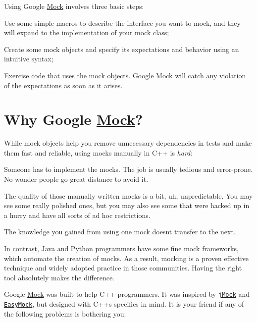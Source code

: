 Using Google \hyperlink{classMock}{Mock} involves three basic steps\+:


\begin{DoxyEnumerate}
\item Use some simple macros to describe the interface you want to mock, and they will expand to the implementation of your mock class;
\end{DoxyEnumerate}
\begin{DoxyEnumerate}
\item Create some mock objects and specify its expectations and behavior using an intuitive syntax;
\end{DoxyEnumerate}
\begin{DoxyEnumerate}
\item Exercise code that uses the mock objects. Google \hyperlink{classMock}{Mock} will catch any violation of the expectations as soon as it arises.
\end{DoxyEnumerate}

\section*{Why Google \hyperlink{classMock}{Mock}?}

While mock objects help you remove unnecessary dependencies in tests and make them fast and reliable, using mocks manually in C++ is {\itshape hard}\+:


\begin{DoxyItemize}
\item Someone has to implement the mocks. The job is usually tedious and error-\/prone. No wonder people go great distance to avoid it.
\item The quality of those manually written mocks is a bit, uh, unpredictable. You may see some really polished ones, but you may also see some that were hacked up in a hurry and have all sorts of ad hoc restrictions.
\item The knowledge you gained from using one mock doesn\textquotesingle{}t transfer to the next.
\end{DoxyItemize}

In contrast, Java and Python programmers have some fine mock frameworks, which automate the creation of mocks. As a result, mocking is a proven effective technique and widely adopted practice in those communities. Having the right tool absolutely makes the difference.

Google \hyperlink{classMock}{Mock} was built to help C++ programmers. It was inspired by \href{http://www.jmock.org/}{\tt j\+Mock} and \href{http://www.easymock.org/}{\tt Easy\+Mock}, but designed with C++\textquotesingle{}s specifics in mind. It is your friend if any of the following problems is bothering you\+:


